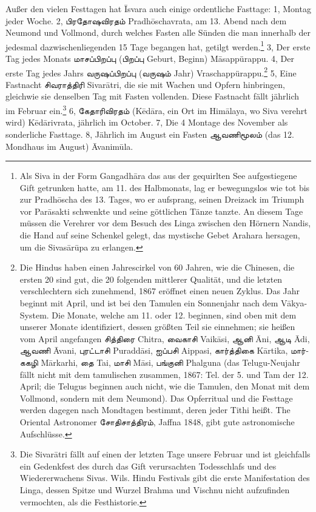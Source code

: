 \documentclass{article}
\newcommand{\TamilText}[1]{\texttamil{#1}}
\newcommand{\tam}[1]{\TamilText{#1}}
\begin{document}
Außer den vielen Festtagen hat \={I}svara auch einige ordentliche Fasttage: 1, Montag jeder Woche. 2, \tam{பிரதோஷவிரதம்} Pradh\={o}schavrata, am 13. Abend nach dem Neumond und Vollmond, durch welches Fasten alle Sünden die man innerhalb der jedesmal dazwischenliegenden 15 Tage begangen hat, getilgt werden.\footnote{Als Siva in der Form Gangadh\={a}ra das aus der gequirlten See aufgestiegene Gift getrunken hatte, am 11. des Halbmonats, lag er bewegungslos wie tot bis zur Pradh\={o}scha des 13. Tages, wo er aufsprang, seinen Dreizack im Triumph vor Par\={a}sakti schwenkte und seine göttlichen Tänze tanzte. An diesem Tage müssen die Verehrer vor dem Besuch des Linga zwischen den Hörnern Nandis, die Hand auf seine Schenkel gelegt, das mystische Gebet Arahara hersagen, um die Sivas\={a}r\={u}pa zu erlangen.} 3, Der erste Tag jedes Monats \tam{மாசப்பிறப்பு} (\tam{பிறப்பு} Geburt, Beginn) M\={a}sappürappu. 4, Der erste Tag jedes Jahrs \tam{வருஷப்பிறப்பு} (\tam{வருஷம்} Jahr) Vraschappürappu.\footnote{Die Hindus haben einen Jahrescirkel von 60 Jahren, wie die Chinesen, die ersten 20 sind gut, die 20 folgenden mittlerer Qualität, und die letzten verschlechtern sich zunehmend, 1867 eröffnet einen neuen Zyklus. Das Jahr beginnt mit April, und ist bei den Tamulen ein Sonnenjahr nach dem V\={a}kya-System. Die Monate, welche am 11. oder 12. beginnen, sind oben mit dem unserer Monate identifiziert, dessen größten Teil sie einnehmen; sie heißen vom April angefangen \tam{சித்திரை} Chitra, \tam{வைகாசி} Vaik\={a}si, \tam{ஆனி} \={A}ni, \tam{ஆடி} \={A}di, \tam{ஆவணி} \={A}vani, \tam{புரட்டாசி} Puradd\={a}si, \tam{ஐப்பசி} Aippasi, \tam{கார்த்திகை} K\={a}rtika, \tam{மார்ககழி} M\={a}rkarhi, \tam{தை} Tai, \tam{மாசி} M\={a}si, \tam{பங்குனி} Phalguna (das Telugu-Neujahr fällt nicht mit dem tamulischen zusammen, 1867: Tel. der 5. und Tam der 12. April; die Telugus beginnen auch nicht, wie die Tamulen, den Monat mit dem Vollmond, sondern mit dem Neumond). Das Opferritual und die Festtage werden dagegen nach Mondtagen bestimmt, deren jeder Tithi heißt. The Oriental Astronomer \tam{சோதிசாத்திரம்}, Jaffna 1848, gibt gute astronomische Aufschlüsse.} 5, Eine Fastnacht \tam{சிவராத்திரி} Sivar\={a}tri, die sie mit Wachen und Opfern hinbringen, gleichwie sie denselben Tag mit Fasten vollenden. Diese Fastnacht fällt jährlich im Februar ein.\footnote{Die Sivar\={a}tri fällt auf einen der letzten Tage unsere Februar und ist gleichfalls ein Gedenkfest des durch das Gift verursachten Todesschlafs und des Wiedererwachens Sivas. Wils. Hindu Festivals gibt die erste Manifestation des Linga, dessen Spitze und Wurzel Brahma und Vischnu nicht aufzufinden vermochten, als die Festhistorie.} 6, \tam{கேதாரிவிரதம்} (K\={e}d\={a}ra, ein Ort im Him\={a}laya, wo Siva verehrt wird) K\={e}d\={a}rivrata, jährlich im October. 7, Die 4 Montage des November als sonderliche Fasttage. 8, Jährlich im August ein Fasten \tam{ஆவணிமூலம்} (das 12. Mondhaus im August) \={A}vanim\={u}la.
\end{document}
